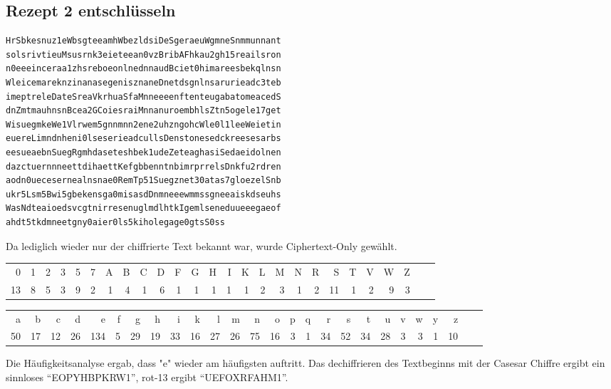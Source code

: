 \subsection{Rezept 2 entschlüsseln}
\label{RezeptZweiEntschluesseln}

\begin{lstlisting}[caption={Das verschlüsselte 2. Rezept: Rezept2NR.txt},
 linewidth=\textwidth,
 breaklines, breakatwhitespace=false]
HrSbkesnuz1eWbsgteeamhWbezldsiDeSgeraeuWgmneSnmmunnant
solsrivtieuMsusrnk3eieteean0vzBribAFhkau2gh15reailsron
n0eeeinceraa1zhsreboeonlnednnaudBciet0himareesbekqlnsn
WleicemareknzinanasegenisznaneDnetdsgnlnsarurieadc3teb
imeptreleDateSreaVkrhuaSfaMnneeeenftenteugabatomeacedS
dnZmtmauhnsnBcea2GCoiesraiMnnanuroembhlsZtn5ogele17get
WisuegmkeWe1Vlrwem5gnnmnn2ene2uhzngohcWle0l1leeWeietin
euereLimndnheni0lseserieadcullsDenstonesedckreesesarbs
eesueaebnSuegRgmhdaseteshbek1udeZeteaghasiSedaeidolnen
dazctuernnneettdihaettKefgbbenntnbimrprrelsDnkfu2rdren
aodn0uecesernealnsnae0RemTp51Suegznet30atas7gloezelSnb
ukr5Lsm5Bwi5gbekensga0misasdDnmneeewmmssgneeaiskdseuhs
WasNdteaioedsvcgtnirresenuglmdlhtkIgemlseneduueeegaeof
ahdt5tkdmneetgny0aier0ls5kiholegage0gtsS0ss
\end{lstlisting}

Da lediglich wieder nur der chiffrierte Text bekannt war, wurde Ciphertext-Only
gewählt.

\begin{table}\footnotesize
\begin{tabular}{*{26}{@{\hspace{1ex}}r}}
 0 & 1 & 2 & 3 & 5 & 7 & A & B & C & D & F & G & H & I & K & L & M & N & R & S & T & V & W & Z \\
 13 & 8 & 5 & 3 & 9 & 2 & 1 & 4 & 1 & 6 & 1 & 1 & 1 & 1 & 1 & 2 & 3 & 1 & 2 & 11 & 1 & 2 & 9 & 3 \\
\end{tabular}

\begin{tabular}{*{26}{@{\hspace{1ex}}r}}
 a & b & c & d & e & f & g & h & i & k & l & m & n & o & p & q & r & s & t & u & v & w & y & z \\
 50 & 17 & 12 & 26 & 134 & 5 & 29 & 19 & 33 & 16 & 27 & 26 & 75 & 16 & 3 & 1 & 34 & 52 & 34 & 28 & 3 & 3 & 1 & 10 \\
\end{tabular}
\end{table}

Die Häufigkeitsanalyse ergab, dass "e" wieder am häufigsten auftritt. Das
dechiffrieren des Textbeginns mit der Casesar Chiffre ergibt ein sinnloses
``EOPYHBPKRW1'', rot-13 ergibt ``UEFOXRFAHM1''.

